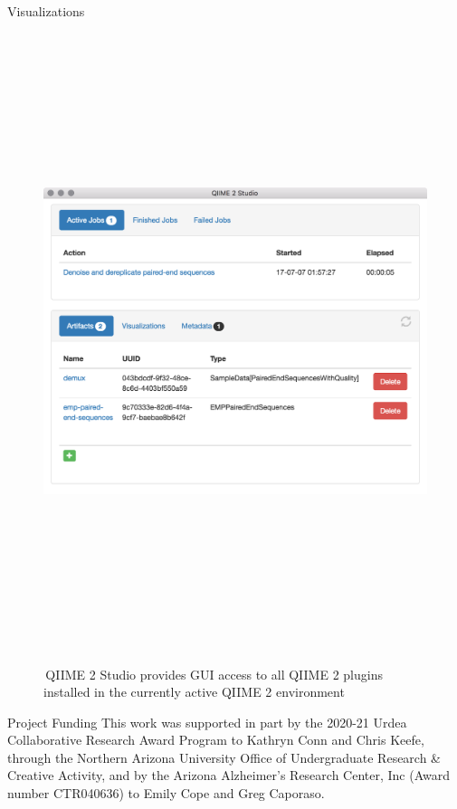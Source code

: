 \documentclass[final]{beamer}
\newlength{\colwidth}
\begin{document}
\begin{frame}[t]
\begin{columns}[t]
\begin{column}{\colwidth}
\begin{block}{Visualizations}
    \begin{figure}[tph!]
      {\includegraphics[height=18cm]{assets/q2studio}}
      \caption{\,QIIME 2 Studio provides GUI access to all QIIME 2 plugins installed in the currently active QIIME 2 environment}
      \label{fig:q2studio}
    \end{figure}
  \end{block}

  \begin{block}{Project Funding}
    This work was supported in part by the 2020-21 Urdea Collaborative
    Research Award Program to Kathryn Conn and Chris Keefe, through the
    Northern Arizona University Office of Undergraduate Research \& Creative
    Activity, and by the Arizona Alzheimer’s Research Center, Inc (Award
    number CTR040636) to Emily Cope and Greg Caporaso.
  \end{block}
\end{column}


\end{columns}
\end{frame}
\end{document}
